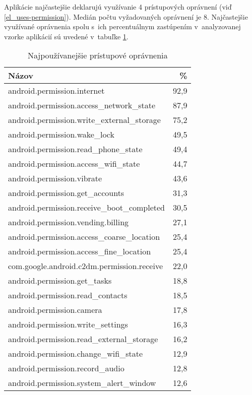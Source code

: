 Aplikácie najčastejšie deklarujú využívanie 4 prístupových oprávnení (viď \ref{el_uses-permission}). Medián počtu vyžadovaných oprávnení je 8. Najčastejšie využívané oprávnenia spolu s~ich percentuálnym zastúpením v~analyzovanej vzorke aplikácií sú uvedené v~tabuľke \ref{tab:permissions}. 
\begin{table}[!htbp]
\centering
  \begin{tabular}{|l r|}
    \hline
    Názov & \% \\\hline\hline
    android.permission.internet & 92,9 \\
    android.permission.access\_network\_state & 87,9 \\
    android.permission.write\_external\_storage & 75,2 \\
    android.permission.wake\_lock & 49,5 \\
    android.permission.read\_phone\_state & 49,4 \\
    android.permission.access\_wifi\_state & 44,7 \\
    android.permission.vibrate & 43,6 \\
    android.permission.get\_accounts & 31,3 \\
    android.permission.receive\_boot\_completed & 30,5 \\
    android.permission.vending.billing & 27,1 \\
    android.permission.access\_coarse\_location & 25,4 \\
    android.permission.access\_fine\_location & 25,4 \\
    com.google.android.c2dm.permission.receive & 22,0 \\
    android.permission.get\_tasks & 18,8 \\
    android.permission.read\_contacts & 18,5 \\
    android.permission.camera & 17,8 \\
    android.permission.write\_settings & 16,3 \\
    android.permission.read\_external\_storage & 16,2 \\
    android.permission.change\_wifi\_state & 12,9 \\
    android.permission.record\_audio & 12,8 \\
     android.permission.system\_alert\_window & 12,6 \\
    \hline
  \end{tabular}
  \caption{Najpoužívanejšie prístupové oprávnenia}
  \label{tab:permissions}
\end{table}

